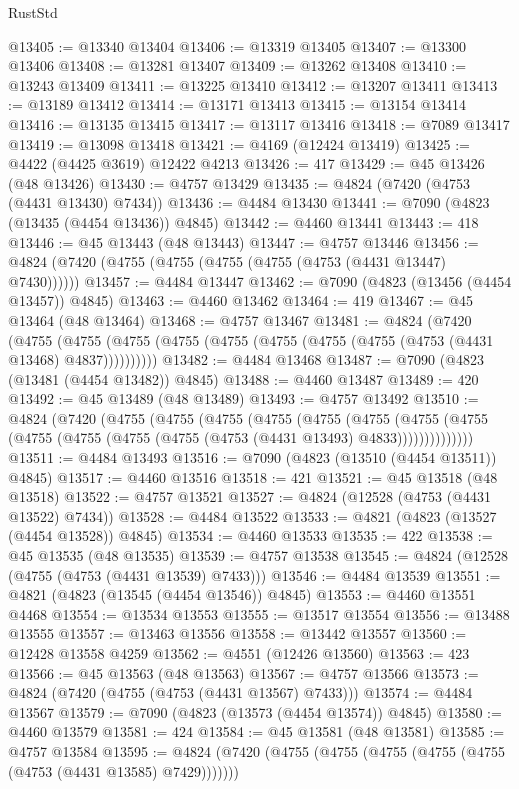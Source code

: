 \begin{lexlean}{RustStd}
\begin{coremodule}
@13405 := @13340 @13404
@13406 := @13319 @13405
@13407 := @13300 @13406
@13408 := @13281 @13407
@13409 := @13262 @13408
@13410 := @13243 @13409
@13411 := @13225 @13410
@13412 := @13207 @13411
@13413 := @13189 @13412
@13414 := @13171 @13413
@13415 := @13154 @13414
@13416 := @13135 @13415
@13417 := @13117 @13416
@13418 := @7089 @13417
@13419 := @13098 @13418
@13421 := @4169 (@12424 @13419)
@13425 := @4422 (@4425 @3619) @12422 @4213
@13426 := 417
@13429 := @45 @13426 (@48 @13426)
@13430 := @4757 @13429
@13435 := @4824 (@7420 (@4753 (@4431 @13430) @7434))
@13436 := @4484 @13430
@13441 := @7090 (@4823 (@13435 (@4454 @13436)) @4845)
@13442 := @4460 @13441
@13443 := 418
@13446 := @45 @13443 (@48 @13443)
@13447 := @4757 @13446
@13456 := @4824 (@7420 (@4755 (@4755 (@4755 (@4755 (@4753 (@4431 @13447) @7430))))))
@13457 := @4484 @13447
@13462 := @7090 (@4823 (@13456 (@4454 @13457)) @4845)
@13463 := @4460 @13462
@13464 := 419
@13467 := @45 @13464 (@48 @13464)
@13468 := @4757 @13467
@13481 := @4824
    (@7420
      (@4755 (@4755 (@4755 (@4755 (@4755 (@4755 (@4755 (@4755 (@4753 (@4431 @13468) @4837))))))))))
@13482 := @4484 @13468
@13487 := @7090 (@4823 (@13481 (@4454 @13482)) @4845)
@13488 := @4460 @13487
@13489 := 420
@13492 := @45 @13489 (@48 @13489)
@13493 := @4757 @13492
@13510 := @4824
    (@7420
      (@4755
        (@4755
          (@4755
            (@4755
              (@4755
                (@4755
                  (@4755
                    (@4755 (@4755 (@4755 (@4755 (@4755 (@4753 (@4431 @13493) @4833))))))))))))))
@13511 := @4484 @13493
@13516 := @7090 (@4823 (@13510 (@4454 @13511)) @4845)
@13517 := @4460 @13516
@13518 := 421
@13521 := @45 @13518 (@48 @13518)
@13522 := @4757 @13521
@13527 := @4824 (@12528 (@4753 (@4431 @13522) @7434))
@13528 := @4484 @13522
@13533 := @4821 (@4823 (@13527 (@4454 @13528)) @4845)
@13534 := @4460 @13533
@13535 := 422
@13538 := @45 @13535 (@48 @13535)
@13539 := @4757 @13538
@13545 := @4824 (@12528 (@4755 (@4753 (@4431 @13539) @7433)))
@13546 := @4484 @13539
@13551 := @4821 (@4823 (@13545 (@4454 @13546)) @4845)
@13553 := @4460 @13551 @4468
@13554 := @13534 @13553
@13555 := @13517 @13554
@13556 := @13488 @13555
@13557 := @13463 @13556
@13558 := @13442 @13557
@13560 := @12428 @13558 @4259
@13562 := @4551 (@12426 @13560)
@13563 := 423
@13566 := @45 @13563 (@48 @13563)
@13567 := @4757 @13566
@13573 := @4824 (@7420 (@4755 (@4753 (@4431 @13567) @7433)))
@13574 := @4484 @13567
@13579 := @7090 (@4823 (@13573 (@4454 @13574)) @4845)
@13580 := @4460 @13579
@13581 := 424
@13584 := @45 @13581 (@48 @13581)
@13585 := @4757 @13584
@13595 := @4824 (@7420 (@4755 (@4755 (@4755 (@4755 (@4755 (@4753 (@4431 @13585) @7429)))))))

\end{coremodule}
\end{lexlean}
